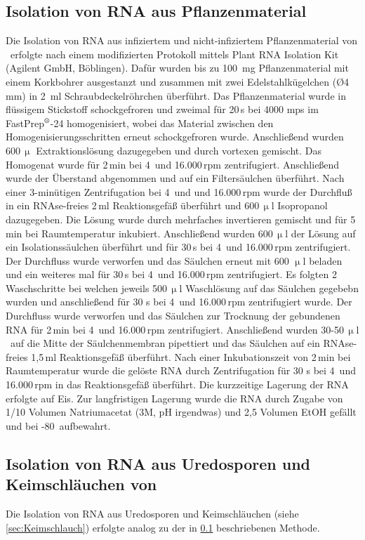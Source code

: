 \subsection{Isolation von RNA aus Pflanzenmaterial}\label{sec:RNA-Pflanze}
Die Isolation von RNA aus infiziertem und nicht-infiziertem Pflanzenmaterial von \Gmax\ erfolgte nach einem modifizierten Protokoll mittels Plant RNA Isolation Kit (Agilent GmbH, Böblingen). Dafür wurden bis zu 100\, mg Pflanzenmaterial mit einem Korkbohrer ausgestanzt und zusammen mit zwei Edelstahlkügelchen (\O 4\,mm) in 2\, ml Schraubdeckelröhrchen überführt. Das Pflanzenmaterial wurde in flüssigem Stickstoff schockgefroren und zweimal für 20\,s bei 4000 \acs{mps} im FastPrep$\textsuperscript{\textregistered}$-24 homogenisiert, wobei das Material zwischen den Homogenisierungsschritten erneut schockgefroren wurde. Anschließend wurden 600\,$\upmu$ Extraktionslösung dazugegeben und durch vortexen gemischt. Das Homogenat wurde für 2\,min bei 4\celcius\ und 16.000\,rpm zentrifugiert. Anschließend wurde der Überstand abgenommen und auf ein Filtersäulchen überführt. Nach einer 3-minütigen Zentrifugation bei 4\celcius\ und und 16.000\,rpm wurde der Durchfluß in ein RNAse-freies 2\,ml Reaktionsgefäß überführt und 600\,$\upmu$l Isopropanol dazugegeben. Die Lösung wurde durch mehrfaches invertieren gemischt und für 5\,min bei Raumtemperatur inkubiert. Anschließend wurden 600\,$\upmu$l der Lösung auf ein Isolationssäulchen überführt und für 30\,s bei  4\celcius\ und 16.000\,rpm zentrifugiert. Der Durchfluss wurde verworfen und das Säulchen erneut mit 600 $\upmu$l beladen und ein weiteres mal für 30\,s bei  4\celcius\ und 16.000\,rpm zentrifugiert. Es folgten 2 Waschschritte bei welchen jeweils 500\,$\upmu$l Waschlösung auf das Säulchen gegebebn wurden und anschließend für 30 s bei  4\celcius\ und 16.000\,rpm zentrifugiert wurde. Der Durchfluss wurde verworfen und das Säulchen zur Trocknung der gebundenen RNA für 2\,min bei 4\celcius\ und 16.000\,rpm zentrifugiert. Anschließend wurden 30-50\,$\upmu$l \depcwasser\ auf die Mitte der Säulchenmembran pipettiert und das Säulchen auf ein RNAse-freies 1,5\,ml Reaktionsgefäß überführt. Nach einer Inkubationszeit von 2\,min bei Raumtemperatur wurde die gelöste RNA durch Zentrifugation für 30 s bei  4\celcius\ und 16.000\,rpm in das Reaktionsgefäß überführt. Die kurzzeitige Lagerung der RNA erfolgte auf Eis. Zur langfristigen Lagerung wurde die RNA durch Zugabe von 1/10 Volumen Natriumacetat (3M, pH irgendwas) und 2,5 Volumen EtOH gefällt und bei -80\celcius\ aufbewahrt. 
\subsection{Isolation von RNA aus Uredosporen und Keimschläuchen von \Ppach}
Die Isolation von RNA aus Uredosporen und Keimschläuchen (siehe \ref{sec:Keimschlauch}) erfolgte analog zu der in \ref{sec:RNA-Pflanze} beschriebenen Methode.    
